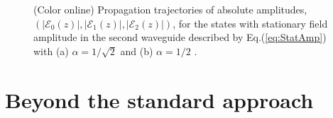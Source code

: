 \documentclass[9pt,twocolumn,twoside]{osajnl}
\begin{document}
\begin{figure}[htbp]
	\centering
	\caption{(Color online) Propagation trajectories of absolute amplitudes, $(\vert \mathcal{E}_{0}(z) \vert, \vert \mathcal{E}_{1}(z) \vert, \vert \mathcal{E}_{2}(z) \vert )$,  for the states with stationary field amplitude in the second waveguide described by Eq.(\ref{eq:StatAmp}) with (a) $\alpha = 1 / \sqrt{2}$ and (b) $\alpha = 1 / 2$ .}
	\label{fig:Fig4}
\end{figure}




\section{Beyond the standard approach}
\end{document}
